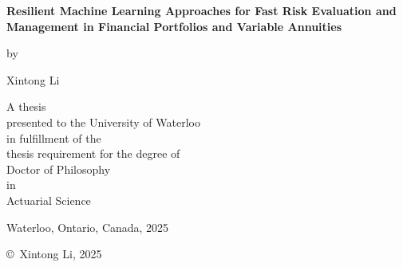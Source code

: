 \pagestyle{empty}

\begin{titlepage}
        \begin{center}
        \vspace*{1.0cm}

        \Huge
        {\bf Resilient Machine Learning Approaches for Fast Risk Evaluation and Management in Financial Portfolios and Variable Annuities}

        \vspace*{1.0cm}

        \normalsize
        by \\

        \vspace*{1.0cm}

        \Large
        Xintong Li \\

        \vspace*{3.0cm}

        \normalsize
        A thesis \\
        presented to the University of Waterloo \\ 
        in fulfillment of the \\
        thesis requirement for the degree of \\
        Doctor of Philosophy \\
        in \\
        Actuarial Science \\

        \vspace*{2.0cm}

        Waterloo, Ontario, Canada, 2025 \\

        \vspace*{0.2cm}

        \copyright\ Xintong Li, 2025 \\
        \end{center}
\end{titlepage}

\pagestyle{plain}
\setcounter{page}{2}

